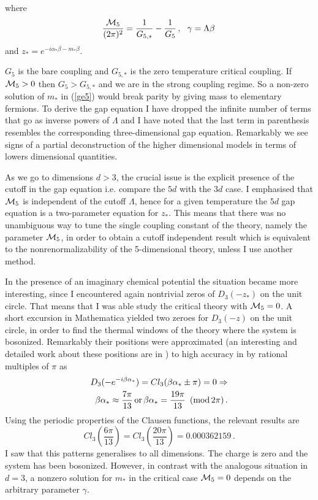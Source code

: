 \documentclass[twoside]{article}
\begin{document}
where 
\begin{equation}
\frac{{\cal M}_5}{(2\pi)^2}=\frac{1}{G_{5,*}}-\frac{1}{G_5}\,,\,\,\,\,\gamma=\Lambda\beta\,
\end{equation}
and $z_*=e^{-i\alpha_*\beta-m_*\beta}$.

$G_5$ is the bare coupling and $G_{5,*}$ is the zero temperature critical coupling. If ${\cal M}_5>0$ then $G_5>G_{5,*}$ and we are in the strong coupling regime. So a non-zero solution of $m_*$ in {(\ref{ge5})} would break parity by giving mass to elementary fermions.
To derive the gap equation I have dropped the infinite number of terms that go as inverse powers of $\Lambda$ and I have noted that the last term in parenthesis resembles the corresponding three-dimensional gap equation. Remarkably we see signs of a partial deconstruction of the higher dimensional models in terms of lowers dimensional quantities. 

As we go to dimensions $d>3$, the crucial issue is the explicit presence of  the cutoff in the gap equation i.e. compare the $5d$ with the $3d$ case. I emphasised that ${\cal M}_5$ is independent of the cutoff $\Lambda$, hence for a given temperature the $5d$ gap equation is a two-parameter equation for $z_*$. This means that there was no unambiguous way to tune the single coupling constant of the theory, namely the parameter ${\cal M}_5$, in order to obtain a cutoff independent result which is equivalent to the nonrenormalizability of the 5-dimensional theory, unless I use another method.
 
In the presence of an imaginary chemical potential the situation became more interesting, since I encountered again nontrivial zeros of $D_3(-z_*)$ on the unit circle. That means that I was able study the critical theory with ${\cal M}_5=0$. A short excursion in Mathematica  yielded two zeroes for $D_3(-z)$ on the unit circle, in order to find the thermal windows of the theory where the system is bosonized. Remarkably their positions were approximated (an interesting and detailed work about these positions are in \cite{Etienne}) to high accuracy in \cite{Filothodoros:2018} by rational multiples of $\pi$ as
\begin{align}
\nonumber D_3(-e^{-i\beta\alpha_*})=Cl_3(\beta\alpha_*\pm\pi)=0\Rightarrow\\ \beta\alpha_*\approx \frac{7\pi}{13}\,{\rm or}\,\beta\alpha_*=\frac{19\pi}{13} \,\,\,({\rm mod}\,2\pi)\,.
\end{align}
Using the periodic properties of the Clausen functions, the relevant results are 
\begin{equation}
Cl_3\left(\frac{6\pi}{13}\right)=Cl_3\left(\frac{20\pi}{13}\right)=0.000362159\,.
\end{equation}
I saw that this patterns generalises to all dimensions.
The charge is zero and the system has been bosonized. However, in contrast with the analogous situation in $d=3$, a nonzero solution for $m_*$ in the critical case ${\cal M}_5=0$ depends on the arbitrary parameter $\gamma$. 
\end{document}
